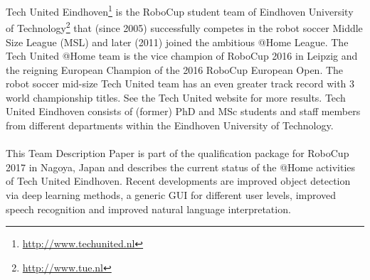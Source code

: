 Tech United Eindhoven\footnote{\url{http://www.techunited.nl}} is the RoboCup student team of Eindhoven University of Technology\footnote{\url{http://www.tue.nl}} that (since 2005) successfully competes in the robot soccer Middle Size League (MSL) and later (2011) joined the ambitious @Home League. The Tech United @Home team is the vice champion of RoboCup 2016 in Leipzig and the reigning European Champion of the 2016 RoboCup European Open. The robot soccer mid-size Tech United team has an even greater track record with 3 world championship titles. See the Tech United website for more results. Tech United Eindhoven consists of (former) PhD and MSc students and staff members from different departments within the Eindhoven University of Technology.
\\\\
This Team Description Paper is part of the qualification package for RoboCup 2017 in Nagoya, Japan and describes the current status of the @Home activities of Tech United Eindhoven. Recent developments are improved object detection via deep learning methods, a generic GUI for different user levels, improved speech recognition and improved natural language interpretation. 